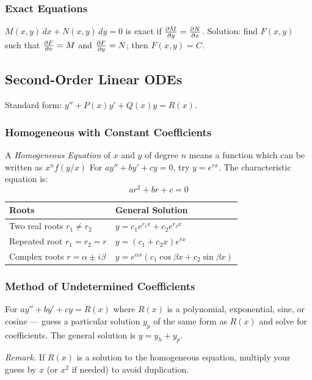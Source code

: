 \documentclass[11pt, letterpaper]{article}
\theoremstyle{plain}
\newenvironment{remark}{\smallskip\noindent\textit{Remark.}}{\smallskip}
\begin{document}
\subsubsection*{Exact Equations}
$M(x,y)\,dx + N(x,y)\,dy = 0$ is exact if $\pdv{M}{y} = \pdv{N}{x}$.
Solution: find $F(x,y)$ such that $\pdv{F}{x} = M$ and $\pdv{F}{y} = N$;
then $F(x,y) = C$.


\subsection{Second-Order Linear ODEs}

Standard form: $y'' + P(x)y' + Q(x)y = R(x)$.

\subsubsection*{Homogeneous with Constant Coefficients}
A \textit{Homogeneous Equation} of $x$ and $y$ of degree $n$ means a function
 which can be written as $x^nf(y/x)$ 
For $ay'' + by' + cy = 0$, try $y = e^{rx}$. The characteristic equation is:
\[
    ar^2 + br + c = 0
\]
\begin{center}
\begin{tabular}{ll}
    \toprule
    Roots & General Solution \\
    \midrule
    Two real roots $r_1 \neq r_2$ & $y = c_1 e^{r_1 x} + c_2 e^{r_2 x}$ \\[4pt]
    Repeated root $r_1 = r_2 = r$ & $y = (c_1 + c_2 x)e^{rx}$ \\[4pt]
    Complex roots $r = \alpha \pm i\beta$ & $y = e^{\alpha x}(c_1\cos\beta x + c_2\sin\beta x)$ \\
    \bottomrule
\end{tabular}
\end{center}

\subsubsection*{Method of Undetermined Coefficients}
For $ay'' + by' + cy = R(x)$ where $R(x)$ is a polynomial, exponential,
sine, or cosine — guess a particular solution $y_p$ of the same form as $R(x)$
and solve for coefficients. The general solution is $y = y_h + y_p$.

\begin{remark}
    If $R(x)$ is a solution to the homogeneous equation, multiply your
    guess by $x$ (or $x^2$ if needed) to avoid duplication.
\end{remark}
\end{document}
